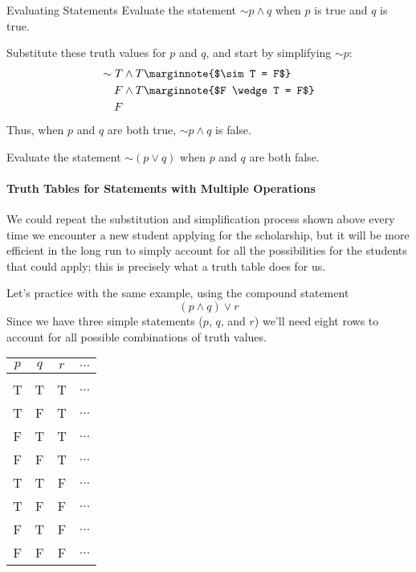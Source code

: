 \begin{example}[https://www.youtube.com/watch?v=TbDIeFHMS00]{Evaluating Statements}
Evaluate the statement $\sim p \wedge q$ when $p$ is true and $q$ is true.

\sol
Substitute these truth values for $p$ and $q$, and start by simplifying $\sim p$:
\begin{align*}
\sim T &\wedge T\marginnote{$\sim T = F$}\\
F &\wedge T\marginnote{$F \wedge T = F$}\\
F
\end{align*}
Thus, when $p$ and $q$ are both true, $\sim p \wedge q$ is false.
\end{example}

\begin{try}
Evaluate the statement $\sim (p \vee q)$ when $p$ and $q$ are both false.
\end{try}

\paragraph{Truth Tables for Statements with Multiple Operations}
We could repeat the substitution and simplification process shown above every time we encounter a new student applying for the scholarship, but it will be more efficient in the long run to simply account for all the possibilities for the students that could apply; this is precisely what a truth table does for us.

Let's practice with the same example, using the compound statement
\[(p \wedge q) \vee r\]
Since we have three simple statements ($p$, $q$, and $r$) we'll need eight rows to account for all possible combinations of truth values.
\begin{center}
\begin{tabular}{|c c c c|}
\hline
$p$ & $q$ & $r$ & $\ldots$\\
\hline
& & &\\
T & T & T & $\ldots$\\
T & F & T & $\ldots$\\
F & T & T & $\ldots$\\
F & F & T & $\ldots$\\
T & T & F & $\ldots$\\
T & F & F & $\ldots$\\
F & T & F & $\ldots$\\
F & F & F & $\ldots$\\
\hline
\end{tabular}
\end{center}


